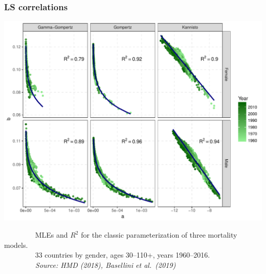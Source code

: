 \documentclass[12pt, xcolor=table]{beamer}  %
\begin{document}
\begin{frame}[noframenumbering]
\frametitle{LS correlations}
\vspace{-0.05cm}
\begin{center}
\includegraphics[scale=0.44]{Figures/Ch1/F6}
\end{center}
\vspace{-0.05cm}
\tiny{$\quad\quad\quad\quad$ MLEs and $R^2$ for the classic parameterization of three mortality models.\\ $\quad\quad\quad\quad$ 33 countries by gender, ages 30--110+, years 1960--2016. \\ \emph{$\quad\quad\quad\quad$ Source: HMD (2018), Basellini et al.~(2019)}} 

\end{frame}
\end{document}
